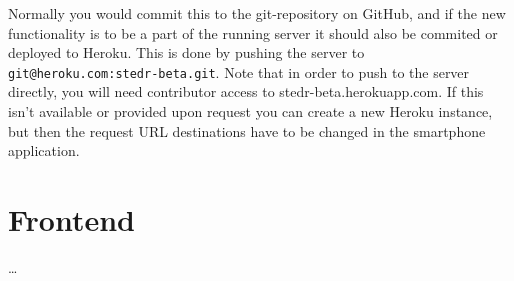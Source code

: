 \documentclass[11pt,a4paper,oneside]{article}
\begin{document}
Normally you would commit this to the git-repository on GitHub, and if the new functionality is to be a part of the running server it should also be commited or deployed to Heroku. This is done by pushing the server to \texttt{git@heroku.com:stedr-beta.git}. Note that in order to push to the server directly, you will need contributor access to stedr-beta.herokuapp.com. If this isn't available or provided upon request you can create a new Heroku instance, but then the request URL destinations have to be changed in the smartphone application.

\section{Frontend}

\dots
\end{document}
